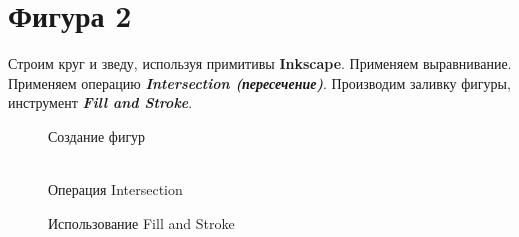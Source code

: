 \newpage
\section[Фигура 2]{Фигура 2}

Строим круг и зведу, используя примитивы \textbf{Inkscape}. 
Применяем выравнивание.
Применяем операцию \textit{\textbf{Intersection (пересечение)}}. 
Производим заливку фигуры, инструмент \textit{\textbf{Fill and Stroke}}.
\begin{figure}[H]
    \begin{minipage}[h]{0.47\linewidth}
         Создание фигур\\
    \end{minipage}
    \hfill
    \begin{minipage}[h]{0.47\linewidth}
        \\ Операция Intersection
    \end{minipage}
    \hfill
    \centering
    \begin{minipage}[h]{0.47\linewidth}
         Использование Fill and Stroke
    \end{minipage}
\end{figure}

